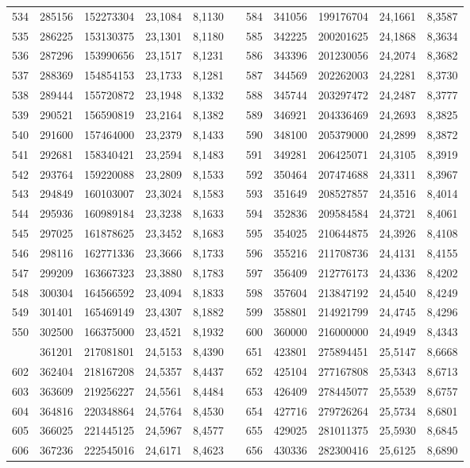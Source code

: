 \begin{longtable}{rrrrrrrrrrr}
534&285156&152273304&23,1084&8,1130&&584&341056&199176704&24,1661&8,3587\\
535&286225&153130375&23,1301&8,1180&&585&342225&200201625&24,1868&8,3634\\
536&287296&153990656&23,1517&8,1231&&586&343396&201230056&24,2074&8,3682\\
537&288369&154854153&23,1733&8,1281&&587&344569&202262003&24,2281&8,3730\\
538&289444&155720872&23,1948&8,1332&&588&345744&203297472&24,2487&8,3777\\
539&290521&156590819&23,2164&8,1382&&589&346921&204336469&24,2693&8,3825\\
540&291600&157464000&23,2379&8,1433&&590&348100&205379000&24,2899&8,3872\\
541&292681&158340421&23,2594&8,1483&&591&349281&206425071&24,3105&8,3919\\
542&293764&159220088&23,2809&8,1533&&592&350464&207474688&24,3311&8,3967\\
543&294849&160103007&23,3024&8,1583&&593&351649&208527857&24,3516&8,4014\\
544&295936&160989184&23,3238&8,1633&&594&352836&209584584&24,3721&8,4061\\
545&297025&161878625&23,3452&8,1683&&595&354025&210644875&24,3926&8,4108\\
546&298116&162771336&23,3666&8,1733&&596&355216&211708736&24,4131&8,4155\\
547&299209&163667323&23,3880&8,1783&&597&356409&212776173&24,4336&8,4202\\
548&300304&164566592&23,4094&8,1833&&598&357604&213847192&24,4540&8,4249\\
549&301401&165469149&23,4307&8,1882&&599&358801&214921799&24,4745&8,4296\\
550&302500&166375000&23,4521&8,1932&&600&360000&216000000&24,4949&8,4343\\
\newpage
601&361201&217081801&24,5153&8,4390&&651&423801&275894451&25,5147&8,6668\\
602&362404&218167208&24,5357&8,4437&&652&425104&277167808&25,5343&8,6713\\
603&363609&219256227&24,5561&8,4484&&653&426409&278445077&25,5539&8,6757\\
604&364816&220348864&24,5764&8,4530&&654&427716&279726264&25,5734&8,6801\\
605&366025&221445125&24,5967&8,4577&&655&429025&281011375&25,5930&8,6845\\
606&367236&222545016&24,6171&8,4623&&656&430336&282300416&25,6125&8,6890\\

\end{longtable}
